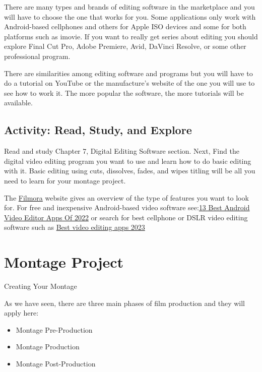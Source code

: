\documentclass[
]{book}
\providecommand{\tightlist}{%
  \setlength{\itemsep}{0pt}\setlength{\parskip}{0pt}}
\begin{document}
There are many types and brands of editing software in the marketplace and you will have to choose the one that works for you. Some applications only work with Android-based cellphones and others for Apple ISO devices and some for both platforms such as imovie. If you want to really get series about editing you should explore Final Cut Pro, Adobe Premiere, Avid, DaVinci Resolve, or some other professional program.

There are similarities among editing software and programs but you will have to do a tutorial on YouTube or the manufacture's website of the one you will use to see how to work it. The more popular the software, the more tutorials will be available.

\hypertarget{activity-read-study-and-explore}{%
\subsection*{Activity: Read, Study, and Explore}\label{activity-read-study-and-explore}}

\begin{reflect}
Read and study Chapter 7, Digital Editing Software section. Next, Find the digital video editing program you want to use and learn how to do basic editing with it. Basic editing using cuts, dissolves, fades, and wipes titling will be all you need to learn for your montage project.

The \href{https://filmora.wondershare.net/filmora-video-editor.html?}{Filmora} website gives an overview of the type of features you want to look for. For free and inexpensive Android-based video software see:\href{https://fossbytes.com/best-android-video-editor-apps/}{13 Best Android Video Editor Apps Of 2022} or search for best cellphone or DSLR video editing software such as \href{https://www.tomsguide.com/best-picks/best-video-editing-apps}{Best video editing apps 2023}
\end{reflect}

\hypertarget{montage-project}{%
\section{Montage Project}\label{montage-project}}

{Creating Your Montage}

As we have seen, there are three main phases of film production and they will apply here:

\begin{itemize}
\tightlist
\item
  Montage Pre-Production
\item
  Montage Production
\item
  Montage Post-Production
\end{itemize}
\end{document}
